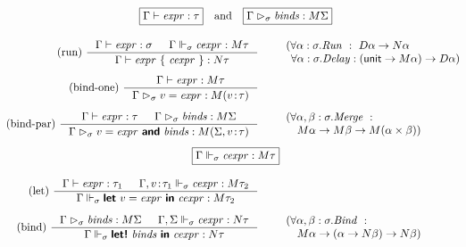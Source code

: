 \documentclass[runningheads,a4paper]{llncs}
\begin{document}

\begin{figure}[t!]
\begin{equation*}\hspace{-2em}
\begin{array}{rl}
\multicolumn{2}{c}{
  \boxed{\Gamma \vdash \expr :\tau}\quad\textnormal{and}\quad
    \boxed{\Gamma \bvdash \binds : \mtyp\Sigma}
}\\[1.5em]
%
(\textnormal{run})~
\inference
  { \Gamma \vdash \expr : \sigma  & \Gamma \cvdash \cexpr : \mtyp{\tau} }
  { \Gamma \vdash \expr ~\{~ \cexpr ~\} : \ntyp \tau }
&\quad\begin{array}{l}
(\forall \alpha: \sigma.\plc{Run}~:~\dtyp{\alpha} \rightarrow \ntyp \alpha \\
\;\,\forall\alpha: \sigma.\plc{Delay} : (\unit \rightarrow \mtyp{\alpha}) \rightarrow \dtyp{\alpha} )
\end{array}
\\[1.5em]
(\textnormal{bind-one})~
\inference 
  { \Gamma \vdash \expr : \mtyp{\tau} }
  { \Gamma \bvdash v=\expr : \mtyp{(\tya{v}{\tau})} }
\\[1.5em]
(\textnormal{bind-par})~
\inference 
  { \Gamma \vdash \expr : \tau & \Gamma \bvdash \binds : \mtyp{\Sigma} }
  { \Gamma \bvdash v=\expr~\kvd{and}~\binds : \mtyp{(\Sigma, \tya{v}{\tau})}  }
&\quad\begin{array}{l}
(\forall\alpha,\beta: \sigma.\plc{Merge}~:\\
\quad \mtyp{\alpha} \rightarrow \mtyp{\beta} \rightarrow \mtyp{(\alpha \times \beta)} )  
\end{array}
\\[1.5em]
%
\multicolumn{2}{c}{
  \boxed{\Gamma \cvdash \cexpr : \mtyp\tau}
}\\[1.5em]
%
(\textnormal{let})~
\inference
  { \Gamma \vdash \expr : \tau_1 &
    \Gamma, \tya{v}{\tau_1} \cvdash \cexpr : \mtyp{\tau_2} }
  { \Gamma \cvdash \kvd{let}~v=\expr~\kvd{in}~\cexpr : \mtyp{\tau_2}  }
\\[1.5em]
(\textnormal{bind})~
\inference
  { \Gamma \bvdash \binds : \mtyp\Sigma &
    \Gamma, \Sigma \cvdash \cexpr : \ntyp{\tau} }
  { \Gamma \cvdash \kvd{let!}~\binds~\kvd{in}~\cexpr : \ntyp{\tau}  }
&\quad\begin{array}{l}
(\forall\alpha,\beta: \sigma.\plc{Bind}~:\\
\quad \mtyp{\alpha} \rightarrow (\alpha \rightarrow \ntyp{\beta}) \rightarrow \ntyp{\beta} )  

\end{array}
\end{array}
\end{equation*}
\end{figure}
\end{document}
